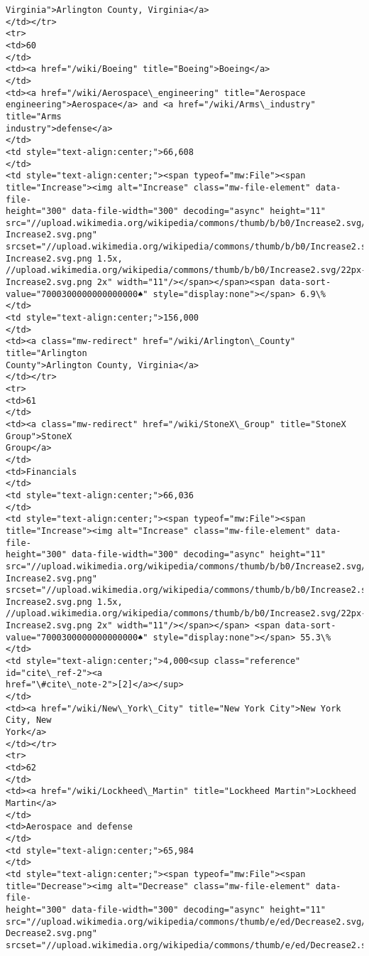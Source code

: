 \documentclass[11pt]{article}
\begin{document}
\begin{Verbatim}[commandchars=\\\{\}]
Virginia">Arlington County, Virginia</a>
</td></tr>
<tr>
<td>60
</td>
<td><a href="/wiki/Boeing" title="Boeing">Boeing</a>
</td>
<td><a href="/wiki/Aerospace\_engineering" title="Aerospace
engineering">Aerospace</a> and <a href="/wiki/Arms\_industry" title="Arms
industry">defense</a>
</td>
<td style="text-align:center;">66,608
</td>
<td style="text-align:center;"><span typeof="mw:File"><span
title="Increase"><img alt="Increase" class="mw-file-element" data-file-
height="300" data-file-width="300" decoding="async" height="11"
src="//upload.wikimedia.org/wikipedia/commons/thumb/b/b0/Increase2.svg/11px-
Increase2.svg.png"
srcset="//upload.wikimedia.org/wikipedia/commons/thumb/b/b0/Increase2.svg/17px-
Increase2.svg.png 1.5x,
//upload.wikimedia.org/wikipedia/commons/thumb/b/b0/Increase2.svg/22px-
Increase2.svg.png 2x" width="11"/></span></span><span data-sort-
value="7000300000000000000♠" style="display:none"></span> 6.9\%
</td>
<td style="text-align:center;">156,000
</td>
<td><a class="mw-redirect" href="/wiki/Arlington\_County" title="Arlington
County">Arlington County, Virginia</a>
</td></tr>
<tr>
<td>61
</td>
<td><a class="mw-redirect" href="/wiki/StoneX\_Group" title="StoneX Group">StoneX
Group</a>
</td>
<td>Financials
</td>
<td style="text-align:center;">66,036
</td>
<td style="text-align:center;"><span typeof="mw:File"><span
title="Increase"><img alt="Increase" class="mw-file-element" data-file-
height="300" data-file-width="300" decoding="async" height="11"
src="//upload.wikimedia.org/wikipedia/commons/thumb/b/b0/Increase2.svg/11px-
Increase2.svg.png"
srcset="//upload.wikimedia.org/wikipedia/commons/thumb/b/b0/Increase2.svg/17px-
Increase2.svg.png 1.5x,
//upload.wikimedia.org/wikipedia/commons/thumb/b/b0/Increase2.svg/22px-
Increase2.svg.png 2x" width="11"/></span></span> <span data-sort-
value="7000300000000000000♠" style="display:none"></span> 55.3\%
</td>
<td style="text-align:center;">4,000<sup class="reference" id="cite\_ref-2"><a
href="\#cite\_note-2">[2]</a></sup>
</td>
<td><a href="/wiki/New\_York\_City" title="New York City">New York City, New
York</a>
</td></tr>
<tr>
<td>62
</td>
<td><a href="/wiki/Lockheed\_Martin" title="Lockheed Martin">Lockheed Martin</a>
</td>
<td>Aerospace and defense
</td>
<td style="text-align:center;">65,984
</td>
<td style="text-align:center;"><span typeof="mw:File"><span
title="Decrease"><img alt="Decrease" class="mw-file-element" data-file-
height="300" data-file-width="300" decoding="async" height="11"
src="//upload.wikimedia.org/wikipedia/commons/thumb/e/ed/Decrease2.svg/11px-
Decrease2.svg.png"
srcset="//upload.wikimedia.org/wikipedia/commons/thumb/e/ed/Decrease2.svg/17px-

\end{Verbatim}
\end{document}
